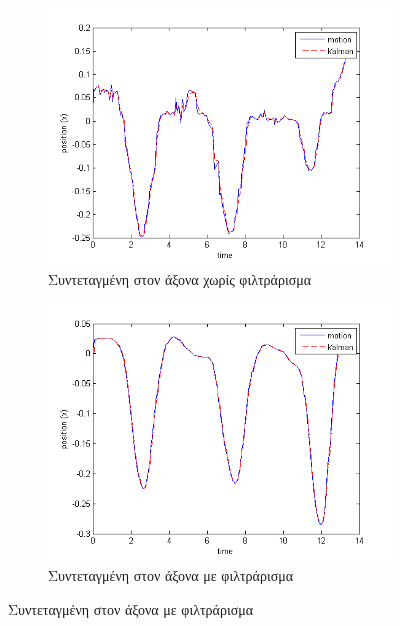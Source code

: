 \begin{figure}[H]
    \centering
    \begin{subfigure}[t]{.48\textwidth}
        \includegraphics[width=\textwidth, keepaspectratio]{fig/filter0-x.png}
        \caption{Συντεταγμένη στον  άξονα χωρίς φιλτράρισμα}
        \label{fig:filter0-x}
    \end{subfigure}
    \begin{subfigure}[t]{.48\textwidth}
        \includegraphics[width=\textwidth, keepaspectratio]{fig/filter3-x.png}
        \caption{Συντεταγμένη στον  άξονα με φιλτράρισμα}
        \label{fig:filter3-x}
    \end{subfigure}


\end{figure}
